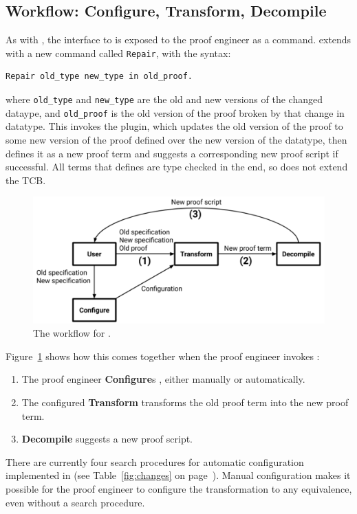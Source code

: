 \subsection{Workflow: Configure, Transform, Decompile}
\label{sec:pi-workflow}

As with \sysname, the interface to \toolnamec is exposed to the proof engineer as a command.
\toolnamec extends \sysnamelong with a new command called \lstinline{Repair},
with the syntax:

\begin{lstlisting}
Repair old_type new_type in old_proof.
\end{lstlisting}
where \lstinline{old_type} and \lstinline{new_type} are the old and new 
versions of the changed dataype, and \lstinline{old_proof} is the old version
of the proof broken by that change in datatype.
This invokes the \toolnamec plugin, which updates the old version of the proof to some new version of the proof
defined over the new version of the datatype, then defines it as a new proof term and suggests a corresponding new proof script if successful.
All terms that \toolnamec defines are type checked in the end, so \toolnamec does not extend the TCB.

\begin{figure}
\includegraphics[width=\columnwidth]{often/workflowa.pdf}
\vspace{-0.7cm}
\caption{The workflow for \toolnamec.}
\vspace{-0.1cm}
\label{fig:system}
\end{figure}

Figure~\ref{fig:system} shows how this comes together when the proof engineer invokes \toolnamec:

\begin{enumerate}
\item The proof engineer \textbf{Configure}s \toolnamec, either manually or automatically.
\item The configured \textbf{Transform} transforms the old proof term into the new proof term.
\item \textbf{Decompile} suggests a new proof script. %
\end{enumerate}
There are currently four search procedures for automatic configuration implemented in \toolnamec (see Table~\ref{fig:changes} on page~\pageref{fig:changes}).
Manual configuration makes it possible
for the proof engineer to configure the transformation to any equivalence,
even without a search procedure.


